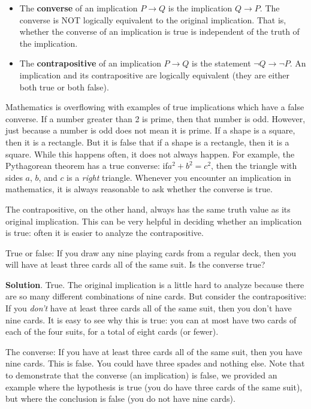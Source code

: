 \documentclass[11pt,]{book}
\newcommand{\terminology}[1]{\textbf{#1}}
\theoremstyle{ptxplainnotitle}
\theoremstyle{ptxplaintitle}
\theoremstyle{ptxdefinitionnotitle}
\theoremstyle{ptxdefinitiontitle}
\theoremstyle{ptxdefinitionnotitle}
\theoremstyle{ptxdefinitiontitle}
\theoremstyle{ptxdefinitionnotitle}
\theoremstyle{ptxdefinitiontitle}
\theoremstyle{ptxdefinitiontitlenonumber}
\theoremstyle{ptxdefinitiontitlenonumber}
\numberwithin{equation}{chapter}
\newcommand{\imp}{\rightarrow}
\begin{document}
\begin{assemblage}\label{assemblage-29}
\hypertarget{p-1720}{}%
%
\begin{itemize}[label=\textbullet]
\item{}\hypertarget{p-1721}{}%
The \terminology{converse}  of an implication \(P \imp Q\) is the implication \(Q \imp P\). The converse is NOT logically equivalent to the original implication.  That is, whether the converse of an implication is true is independent of the truth of the implication.%
\item{}\hypertarget{p-1722}{}%
The \terminology{contrapositive}  of an implication \(P \imp Q\) is the statement \(\neg Q \imp \neg P\). An implication and its contrapositive are logically equivalent (they are either both true or both false).%
\end{itemize}
%
\end{assemblage}
\hypertarget{p-1723}{}%
Mathematics is overflowing with examples of true implications which have a false converse. If a number greater than 2 is prime, then that number is odd. However, just because a number is odd does not mean it is prime. If a shape is a square, then it is a rectangle. But it is false that if a shape is a rectangle, then it is a square. While this happens often, it does not always happen. For example, the Pythagorean theorem has a true converse: if\(a^2 + b^2 = c^2\), then the triangle with sides \(a\), \(b\), and \(c\) is a \emph{right} triangle. Whenever you encounter an implication in mathematics, it is always reasonable to ask whether the converse is true.%
\par
\hypertarget{p-1724}{}%
The contrapositive, on the other hand, always has the same truth value as its original implication. This can be very helpful in deciding whether an implication is true: often it is easier to analyze the contrapositive.%
\begin{example}\label{example-51}
\hypertarget{p-1725}{}%
True or false: If you draw any nine playing cards from a regular deck, then you will have at least three cards all of the same suit. Is the converse true?%
\par\smallskip%
\noindent\textbf{Solution}.\hypertarget{solution-197}{}\quad%
\hypertarget{p-1726}{}%
True. The original implication is a little hard to analyze because there are so many different combinations of nine cards. But consider the contrapositive: If you \emph{don't} have at least three cards all of the same suit, then you don't have nine cards. It is easy to see why this is true: you can at most have two cards of each of the four suits, for a total of eight cards (or fewer).%
\par
\hypertarget{p-1727}{}%
The converse: If you have at least three cards all of the same suit, then you have nine cards. This is false. You could have three spades and nothing else. Note that to demonstrate that the converse (an implication) is false, we provided an example where the hypothesis is true (you do have three cards of the same suit), but where the conclusion is false (you do not have nine cards).%
\end{example}
\end{document}
